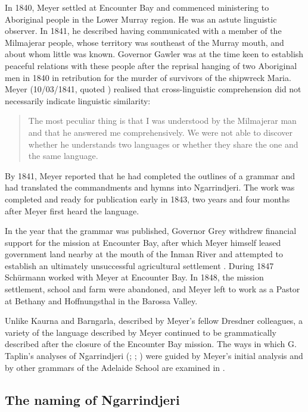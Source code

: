 In 1840, Meyer settled at Encounter Bay and commenced ministering to Aboriginal people in the Lower Murray region. He was an astute linguistic observer. In {1841}, he described having communicated with a member of the Milmajerar people, whose territory was southeast of the Murray mouth, and about whom little was known. Governor Gawler was at the time keen to establish peaceful relations with these people after the reprisal hanging of two Aboriginal men in 1840 in retribution for the murder of survivors of the shipwreck Maria. Meyer (10/03/1841, quoted \citealt[68]{Gale2011}) realised that cross-linguistic comprehension did not necessarily indicate linguistic similarity:

\begin{quote}
	The most peculiar thing is that I was understood by the Milmajerar man and that he answered me comprehensively. We were not able to discover whether he understands two languages or whether they share the one and the same language.
\end{quote}

By 1841, Meyer reported that he had completed the outlines of a grammar \citep[68]{Gale2011} and had translated the commandments and hymns into Ngarrindjeri. The work was completed and ready for publication early in 1843, two years and four months after Meyer first heard the language.

In the year that the grammar was published, Governor Grey withdrew financial support for the mission at Encounter Bay, after which Meyer himself leased government land nearby at the mouth of the Inman River and attempted to establish an ultimately unsuccessful agricultural settlement \citep[15]{Lockwood2007}. During 1847 Schürmann worked with Meyer at Encounter Bay. In {1848}, the mission settlement, school and farm were abandoned, and Meyer left to work as a Pastor at Bethany and Hoffnungsthal in the Barossa Valley.

\hspace*{-2.4pt}Unlike Kaurna and Barngarla, described by Meyer’s fellow Dresdner colleagues, a variety of the language described by Meyer continued to be grammatically described after the closure of the Encounter Bay mission. The ways in which G. Taplin’s analyses of Ngarrindjeri (\citeyear{taplin_vocabulary_1867}; \citeyear{taplin_notes_1872}; \citeyear{taplin_grammar_1880}) were guided by Meyer’s initial analysis and by other grammars of the Adelaide School are examined in .

\subsection{The naming of Ngarrindjeri}
\label{sec:key:6.1.1}

